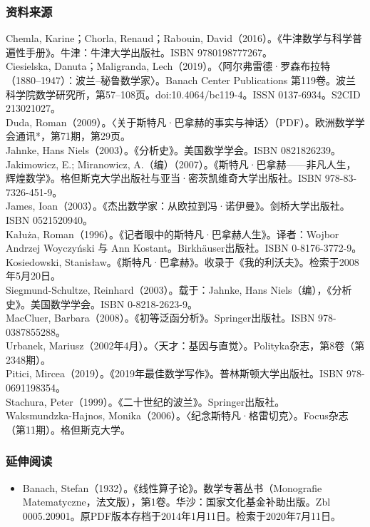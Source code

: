 \subsubsection{资料来源}
Chemla, Karine；Chorla, Renaud；Rabouin, David（2016）。《牛津数学与科学普遍性手册》。牛津：牛津大学出版社。ISBN 9780198777267。\\
Ciesielska, Danuta；Maligranda, Lech（2019）。〈阿尔弗雷德·罗森布拉特（1880–1947）：波兰–秘鲁数学家〉。Banach Center Publications 第119卷。波兰科学院数学研究所，第57–108页。doi:10.4064/bc119-4。ISSN 0137-6934。S2CID 213021027。\\
Duda, Roman（2009）。〈关于斯特凡·巴拿赫的事实与神话〉（PDF）。欧洲数学学会通讯*，第71期，第29页。\\
Jahnke, Hans Niels（2003）。《分析史》。美国数学学会。ISBN 0821826239。\\
Jakimowicz, E.; Miranowicz, A.（编）（2007）。《斯特凡·巴拿赫——非凡人生，辉煌数学》。格但斯克大学出版社与亚当·密茨凯维奇大学出版社。ISBN 978-83-7326-451-9。\\
James, Ioan（2003）。《杰出数学家：从欧拉到冯·诺伊曼》。剑桥大学出版社。ISBN 0521520940。\\
Kałuża, Roman（1996）。《记者眼中的斯特凡·巴拿赫人生》。译者：Wojbor Andrzej Woyczyński 与 Ann Kostant。Birkhäuser出版社。ISBN 0-8176-3772-9。\\
Kosiedowski, Stanisław。《斯特凡·巴拿赫》。收录于《我的利沃夫》。检索于2008年5月20日。\\
Siegmund-Schultze, Reinhard（2003）。载于：Jahnke, Hans Niels（编），《分析史》。美国数学学会。ISBN 0-8218-2623-9。\\
MacCluer, Barbara（2008）。《初等泛函分析》。Springer出版社。ISBN 978-0387855288。\\
Urbanek, Mariusz（2002年4月）。〈天才：基因与直觉〉。Polityka杂志，第8卷（第2348期）。\\
Pitici, Mircea（2019）。《2019年最佳数学写作》。普林斯顿大学出版社。ISBN 978-0691198354。\\
Stachura, Peter（1999）。《二十世纪的波兰》。Springer出版社。\\
Waksmundzka-Hajnos, Monika（2006）。〈纪念斯特凡·格雷切克〉。Focus杂志（第11期）。格但斯克大学。
\subsubsection{延伸阅读}
\begin{itemize}
\item Banach, Stefan（1932）。《线性算子论》。数学专著丛书（Monografie Matematyczne，法文版），第1卷。华沙：国家文化基金补助出版。Zbl 0005.20901。原PDF版本存档于2014年1月11日。检索于2020年7月11日。
\end{itemize}